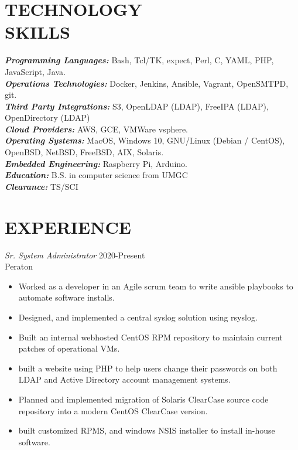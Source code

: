 \documentclass[margin, 10pt]{res} %
\begin{document}
\begin{resume}


\section{TECHNOLOGY \\ SKILLS}

{\sl \textbf{Programming Languages:}} Bash, Tcl/TK, expect, Perl, C, YAML, PHP, JavaScript, Java. \\
{\sl \textbf{Operations Technologies:}} Docker, Jenkins, Ansible, Vagrant, OpenSMTPD, git. \\
{\sl \textbf{Third Party Integrations:}} S3, OpenLDAP (LDAP), FreeIPA (LDAP), OpenDirectory (LDAP) \\
{\sl \textbf{Cloud Providers:}} AWS, GCE, VMWare vsphere. \\
{\sl \textbf{Operating Systems:}} MacOS, Windows 10, GNU/Linux (Debian / CentOS), OpenBSD, NetBSD, FreeBSD, AIX, Solaris. \\
{\sl \textbf{Embedded Engineering:}} Raspberry Pi, Arduino. \\
{\sl \textbf{Education:}} B.S. in computer science from UMGC\\
{\sl \textbf{Clearance:}} TS/SCI \\


\section{EXPERIENCE}

{\sl Sr. System Administrator } \hfill 2020-Present \\
Peraton
\begin{itemize}
  \item Worked as a developer in an Agile scrum team to write ansible playbooks to automate software installs.
  \item Designed, and implemented a central syslog solution using rsyslog.
  \item Built an internal webhosted CentOS RPM repository to maintain current patches of operational VMs.
  \item built a website using PHP to help users change their passwords on both LDAP and Active Directory account management systems.
  \item Planned and implemented migration of Solaris ClearCase source code repository into a modern CentOS ClearCase version.
  \item built customized RPMS, and windows NSIS installer to install in-house software.
\end{itemize}


\end{resume}
\end{document}
